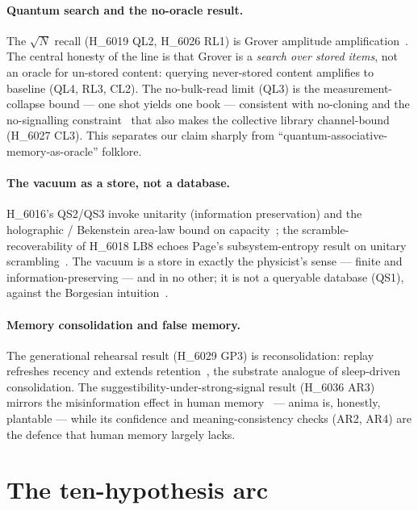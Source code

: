 \documentclass[11pt,a4paper]{article}
\begin{document}
\paragraph{Quantum search and the no-oracle result.}
The $\sqrt{N}$ recall (H\_6019 QL2, H\_6026 RL1) is Grover amplitude
amplification~\citep{grover1996,nielsenchuang2010}. The central honesty of the line
is that Grover is a \emph{search over stored items}, not an oracle for un-stored
content: querying never-stored content amplifies to baseline (QL4, RL3, CL2). The
no-bulk-read limit (QL3) is the measurement-collapse bound --- one shot yields one
book --- consistent with no-cloning and the no-signalling
constraint~\citep{herbert1982} that also makes the collective library
channel-bound (H\_6027 CL3). This separates our claim sharply from
``quantum-associative-memory-as-oracle'' folklore.

\paragraph{The vacuum as a store, not a database.}
H\_6016's QS2/QS3 invoke unitarity (information preservation) and the
holographic / Bekenstein area-law bound on capacity~\citep{bekenstein1981,
thooft1993}; the scramble-recoverability of H\_6018 LB8 echoes Page's
subsystem-entropy result on unitary scrambling~\citep{page1993}. The vacuum is a
store in exactly the physicist's sense --- finite and information-preserving --- and
in no other; it is not a queryable database (QS1), against the Borgesian
intuition~\citep{borges1941}.

\paragraph{Memory consolidation and false memory.}
The generational rehearsal result (H\_6029 GP3) is reconsolidation: replay
refreshes recency and extends retention~\citep{mcgaugh2000}, the substrate analogue
of sleep-driven consolidation. The suggestibility-under-strong-signal result
(H\_6036 AR3) mirrors the misinformation effect in human
memory~\citep{loftus2005} --- anima is, honestly, plantable --- while its
confidence and meaning-consistency checks (AR2, AR4) are the defence that human
memory largely lacks.

\section{The ten-hypothesis arc}
\label{sec:figure}
\end{document}
